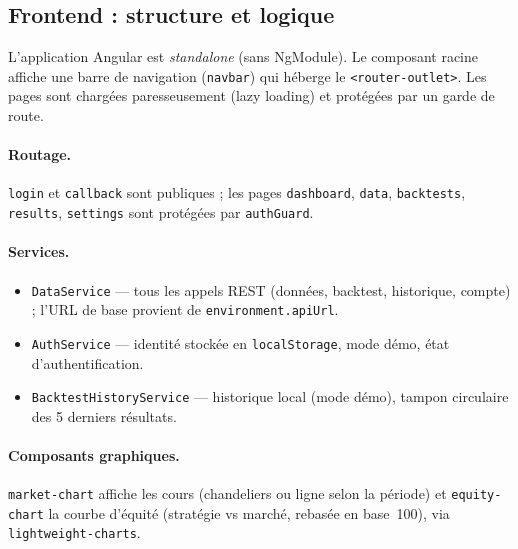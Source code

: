 \documentclass[11pt,a4paper]{article}
\newcommand{\code}[1]{\texttt{#1}}
\begin{document}
\subsection{Frontend : structure et logique}
L'application Angular est \emph{standalone} (sans NgModule). Le composant racine
affiche une barre de navigation (\code{navbar}) qui héberge le
\code{<router-outlet>}. Les pages sont chargées paresseusement (lazy loading) et
protégées par un garde de route.

\paragraph{Routage.} \code{login} et \code{callback} sont publiques ; les pages
\code{dashboard}, \code{data}, \code{backtests}, \code{results}, \code{settings}
sont protégées par \code{authGuard}.

\paragraph{Services.}
\begin{itemize}[leftmargin=1.4em]
  \item \code{DataService} --- tous les appels REST (données, backtest, historique,
        compte) ; l'URL de base provient de \code{environment.apiUrl}.
  \item \code{AuthService} --- identité stockée en \code{localStorage}, mode démo,
        état d'authentification.
  \item \code{BacktestHistoryService} --- historique local (mode démo), tampon
        circulaire des 5 derniers résultats.
\end{itemize}

\paragraph{Composants graphiques.} \code{market-chart} affiche les cours
(chandeliers ou ligne selon la période) et \code{equity-chart} la courbe
d'équité (stratégie vs marché, rebasée en base~100), via \code{lightweight-charts}.
\end{document}
